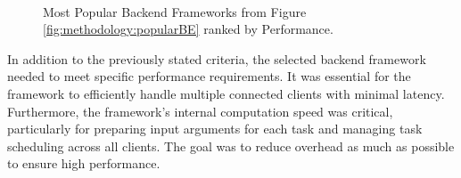 \begin{figure}[htbp]
  \myfloatalign
   \\
   \caption{Most Popular Backend Frameworks from Figure \ref{fig:methodology:popularBE} ranked by Performance.}
   \label{fig:methodology:benchmarkBE}
\end{figure}
In addition to the previously stated criteria, the selected backend framework needed to meet specific performance requirements. It was essential for the framework to efficiently handle multiple connected clients with minimal latency. Furthermore, the framework's internal computation speed was critical, particularly for preparing input arguments for each task and managing task scheduling across all clients. The goal was to reduce overhead as much as possible to ensure high performance.

